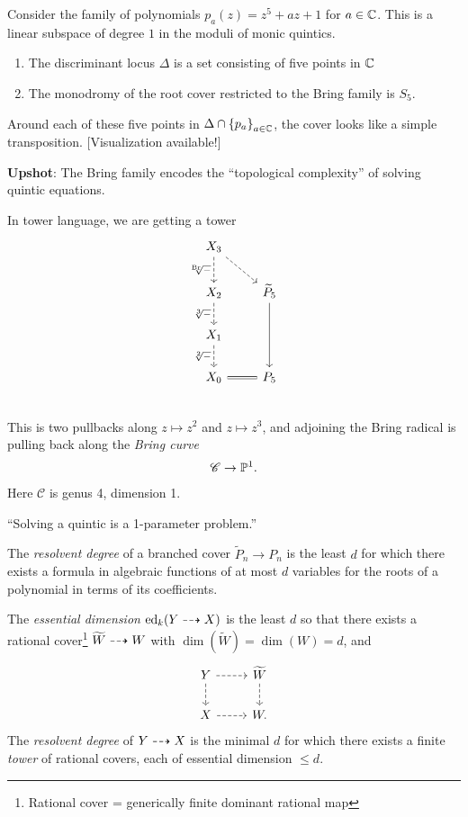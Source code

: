 \documentclass[11pt]{amsart}
\let\til\widetilde
\providecommand{\Br}{\mathrm{Br}}
\begin{document}
\begin{remark} Consider the family of polynomials $p_a(z) = z^5 + az + 1$ for $a\in \C$. This is a linear subspace of degree $1$ in the moduli of monic quintics.
\begin{enumerate}
    \item The discriminant locus $\Delta$ is a set consisting of five points in $\C$
    \item The monodromy of the root cover restricted to the Bring family is $S_5$.
\end{enumerate}
Around each of these five points in $\Delta \cap \left\{ p_a \right\}_{a\in \C}$, the cover looks like a simple transposition. [Visualization available!]
\end{remark}

\textbf{Upshot}: The Bring family encodes the ``topological complexity'' of solving quintic equations.

In tower language, we are getting a tower
\[ \begin{tikzcd}
    X_3\dar["{\sqrt[\Br]{-}}" left,dashed]\ar[dr,dashed] & \\
    X_2\dar["{\sqrt[3]{-}}" left,dashed] & \til{P}_5\ar[dd]\\
    X_1\dar["{\sqrt[2]{-}}" left,dashed] & \\
    X_0\rar[equal] & P_5\\
\end{tikzcd} \]
This is two pullbacks along $z\mapsto z^2$ and $z\mapsto z^3$, and adjoining the Bring radical is pulling back along the \textit{Bring curve}
\begin{align*}
    \mathscr{C} \to\P^1.
\end{align*}
Here $\mathscr{C}$ is genus 4, dimension 1.

``Solving a quintic is a 1-parameter problem.''

\begin{definition} The \textit{resolvent degree} of a branched cover $\til{P}_n \to P_n$ is the least $d$ for which there exists a formula in algebraic functions of at most $d$ variables for the roots of a polynomial in terms of its coefficients.
\end{definition}

\begin{definition} The \textit{essential dimension} $\mathrm{ed}_k(Y \dashto X)$ is the least $d$ so that there exists a rational cover\footnote{Rational cover = generically finite dominant rational map} $\til{W} \dashto W$ with $\dim(\til{W}) = \dim(W) = d$, and
\[ \begin{tikzcd}
    Y\rar[dashed]\dar[dashed] & \til{W}\dar[dashed]\\
    X\rar[dashed] & W.
\end{tikzcd} \]
The \textit{resolvent degree} of $Y \dashto X$ is the minimal $d$ for which there exists a finite \textit{tower} of rational covers, each of essential dimension $\le d$.
\end{definition}
\end{document}
